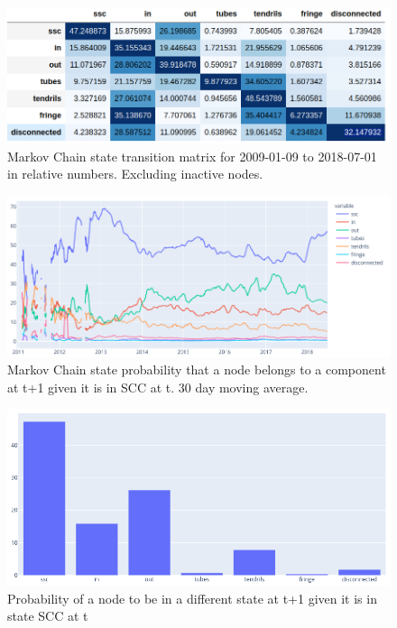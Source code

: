 \documentclass{Resources/netsci-project}
\begin{document}
\lipsum[2]

\begin{figure}[!htb]
    \centering
    \includegraphics[width=0.75\linewidth]{Resources/matrix.png}
    \caption{Markov Chain state transition matrix for 2009-01-09 to 2018-07-01 in relative numbers. Excluding inactive nodes.} 
\end{figure}

\lipsum[2]

\begin{figure}[!htb]
    \centering
    \includegraphics[width=0.9\linewidth]{Resources/MC.png}
    \caption{Markov Chain state probability that a node belongs to a component at t+1 given it is in SCC at t. 30 day moving average.} 
\end{figure}

\lipsum[2]

\begin{figure}[!htb]
    \centering
    \includegraphics[width=0.9\linewidth]{Resources/MC_SCC.png}
    \caption{Probability of a node to be in a different state at t+1 given it is in state SCC at t} 
\end{figure}
\end{document}
